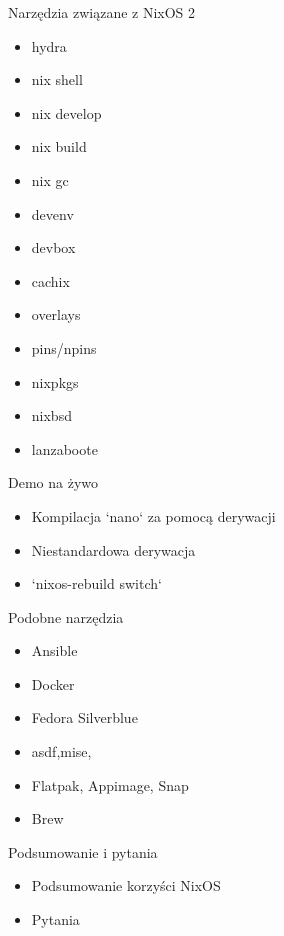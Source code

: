 \documentclass{beamer}
\begin{document}
\begin{frame}{Narzędzia związane z NixOS 2}
    \begin{itemize}
        \item hydra
        \item nix shell
        \item nix develop
        \item nix build
        \item nix gc
        \item devenv
        \item devbox
        \item cachix
        \item overlays
        \item pins/npins
        \item nixpkgs
        \item nixbsd
        \item lanzaboote
    \end{itemize}
\end{frame}

\begin{frame}{Demo na żywo}
    \begin{itemize}
        \item Kompilacja `nano` za pomocą derywacji
        \item Niestandardowa derywacja
        \item `nixos-rebuild switch`
    \end{itemize}
\end{frame}

\begin{frame}{Podobne narzędzia}
    \begin{itemize}
        \item Ansible
        \item Docker
        \item Fedora Silverblue
        \item asdf,mise,
        \item Flatpak, Appimage, Snap
        \item Brew
    \end{itemize}
\end{frame}
\begin{frame}{Podsumowanie i pytania}
    \begin{itemize}
        \item Podsumowanie korzyści NixOS
        \item Pytania
    \end{itemize}
\end{frame}
\end{document}
